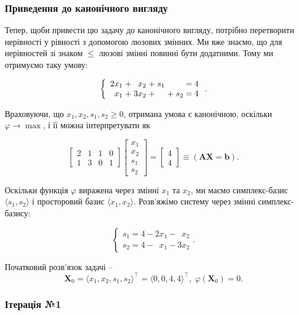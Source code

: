 \documentclass[\main/book.tex]{subfiles}
\begin{document}
\subsubsection{Приведення до канонічного вигляду}

Тепер, щоби привести цю задачу до канонічного вигляду, потрібно перетворити нерівності у рівності з допомогою люзових змінних. Ми вже знаємо, що для нерівностей зі знаком \flqq{}$\leq$\frqq{} люзові змінні повинні бути додатними. Тому ми отримуємо таку умову:

\[
 \left\{
  \begin{array}{r@{\;}r@{\;}r@{\;}r@{\;}r@{\;}l@{\;}l@{\;}l}
   2 x_1 & + &   x_2 & + & s_1 &     &     & = 4  \\
     x_1 & + & 3 x_2 & + &       & + & s_2 & = 4
  \end{array}
 \right..
\]

Враховуючи, що $x_1, x_2, s_1, s_2 \geq 0$, отримана умова є канонічною, оскільки $\varphi \rightarrow \max$, і її можна інтерпретувати як

\[
 \begin{bmatrix}
  2 & 1 & 1 & 0 \\
  1 & 3 & 0 & 1
 \end{bmatrix}
 \begin{bmatrix}
  x_1 \\ x_2 \\ s_1 \\ s_2
 \end{bmatrix} =
 \begin{bmatrix}
  4 \\ 4
 \end{bmatrix}
 \equiv
 (\mathbf{A} \mathbf{X} = \mathbf{b}).
\]

Оскільки функція $\varphi$ виражена через змінні $x_1$ та $x_2$, ми маємо симплекс-базис $\langle s_1, s_2 \rangle$ і просторовий базис $\langle x_1, x_2 \rangle$. Розв'яжімо систему через змінні симплекс-базису:

\[
 \left\{
 \begin{array}{l}
  s_1 = 4 - 2 x_1 - \phantom{3} x_2  \\
  s_2 = 4 - \phantom{2} x_1 - 3 x_2
 \end{array}
\right..
\]

Початковий розв'язок задачі -- $$\mathbf{X}_0 = \langle x_1, x_2, s_1, s_2 \rangle^\top = \langle 0, 0, 4, 4 \rangle^\top,\; \varphi(\mathbf{X}_0) = 0 \text{.}$$

\subsubsection{Ітерація №1}
\end{document}
